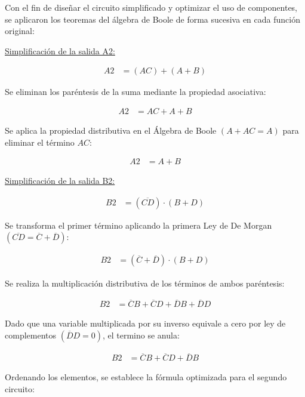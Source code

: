 \documentclass[12pt,letterpaper]{article}
\newcommand{\boolnot}[1]{\ensuremath{\overline{#1}}}
\begin{document}
    Con el fin de diseñar el circuito simplificado y optimizar el uso de componentes, se aplicaron los teoremas del álgebra de Boole de forma sucesiva en cada función original:

    \underline{Simplificación de la salida A2:}

    \begin{align*}
        A2 &= (AC) + (A + B) 
    \end{align*}

    Se eliminan los paréntesis de la suma mediante la propiedad asociativa:

    \begin{align*}
        A2 &= AC + A + B
    \end{align*}

    Se aplica la propiedad distributiva en el Álgebra de Boole $(A + AC = A)$ para eliminar el término $AC$: 

    \begin{align*}
        A2 &= A + B
    \end{align*}

    \underline{Simplificación de la salida B2:}

    \begin{align*}
        B2 &= (\boolnot{CD}) \cdot (B + D)
    \end{align*}

    Se transforma el primer término aplicando la primera Ley de De Morgan $(\boolnot{CD} = \boolnot{C} + \boolnot{D})$:

    \begin{align*}
        B2 &= (\boolnot{C} + \boolnot{D}) \cdot (B + D)
    \end{align*}

    Se realiza la multiplicación distributiva de los términos de ambos paréntesis:

    \begin{align*}
        B2 &= \boolnot{C}B + \boolnot{C}D + \boolnot{D}B + \boolnot{D}D
    \end{align*}

    Dado que una variable multiplicada por su inverso equivale a cero por ley de complementos $(\boolnot{D}D = 0)$, el termino se anula:

    \begin{align*}
        B2 &= \boolnot{C}B + \boolnot{C}D + \boolnot{D}B
    \end{align*}

    Ordenando los elementos, se establece la fórmula optimizada para el segundo circuito:
\end{document}
